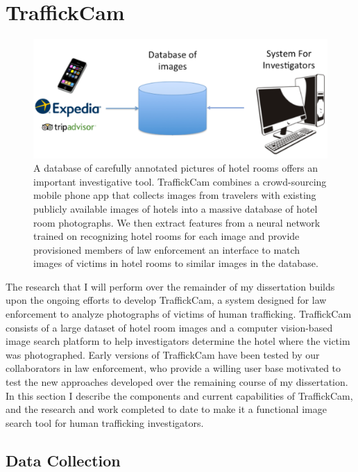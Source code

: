 \documentclass[12pt]{article}
\begin{document}
\section{TraffickCam}
\begin{figure}
    \centering
    \includegraphics[width=.85\textwidth]{figs/tcOverview/tcWorkflow.png}
    \caption[TraffickCam overview]{A database of carefully annotated pictures of hotel rooms offers an important investigative tool.  TraffickCam combines a crowd-sourcing mobile phone app that collects images from travelers with existing publicly available images of hotels into a massive database of hotel room photographs. We then extract features from a neural network trained on recognizing hotel rooms for each image and provide provisioned members of law enforcement an interface to  match images of victims in hotel rooms to similar images in the database.}
    \label{fig:tcam}
\end{figure}

The research that I will perform over the remainder of my dissertation builds upon the ongoing efforts to develop TraffickCam, a system designed for law enforcement to analyze photographs of victims of human trafficking. TraffickCam consists of a large dataset of hotel room images and a computer vision-based image search platform to help investigators determine the hotel where the victim was photographed. Early versions of TraffickCam have been tested by our collaborators in law enforcement, who provide a willing user base motivated to test the new approaches developed over the remaining course of my dissertation. In this section I describe the components and current capabilities of TraffickCam, and the research and work completed to date to make it a functional image search tool for human trafficking investigators.

\subsection{Data Collection}
\end{document}
